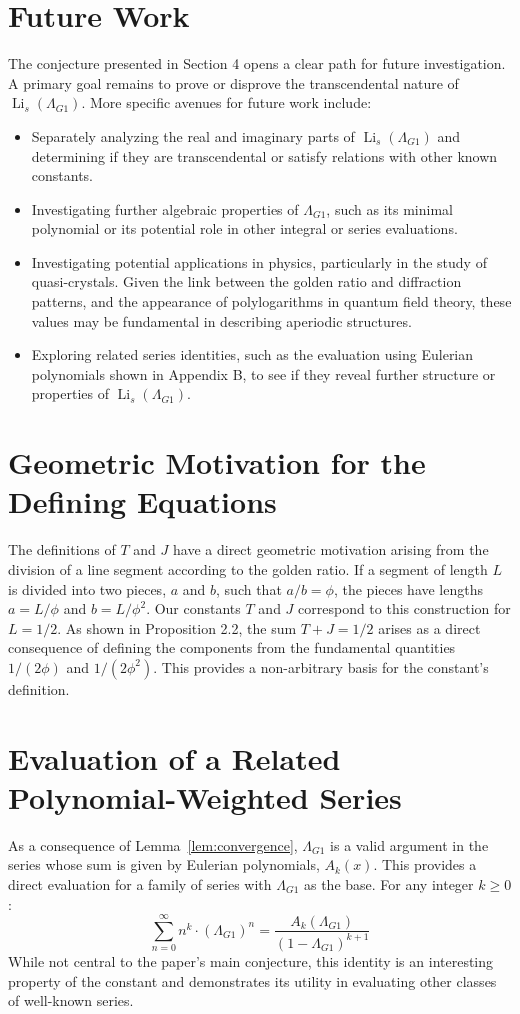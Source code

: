 \documentclass{amsart}
\theoremstyle{plain}
\theoremstyle{definition}
\theoremstyle{remark}
\DeclareMathOperator{\Li}{Li} %
\newcommand{\LambdaG}{\Lambda_{G1}}
\newcommand{\phiG}{\phi}
\begin{document}
\section{Future Work}
The conjecture presented in Section 4 opens a clear path for future investigation. A primary goal remains to prove or disprove the transcendental nature of $\Li_s(\LambdaG)$. More specific avenues for future work include:
\begin{itemize}
    \item Separately analyzing the real and imaginary parts of $\Li_s(\LambdaG)$ and determining if they are transcendental or satisfy relations with other known constants.
    \item Investigating further algebraic properties of $\LambdaG$, such as its minimal polynomial or its potential role in other integral or series evaluations.
    \item Investigating potential applications in physics, particularly in the study of quasi-crystals. Given the link between the golden ratio and diffraction patterns, and the appearance of polylogarithms in quantum field theory, these values may be fundamental in describing aperiodic structures.
    \item Exploring related series identities, such as the evaluation using Eulerian polynomials shown in Appendix B, to see if they reveal further structure or properties of $\Li_s(\LambdaG)$.
\end{itemize}

\appendix
\section{Geometric Motivation for the Defining Equations}
The definitions of $T$ and $J$ have a direct geometric motivation arising from the division of a line segment according to the golden ratio. If a segment of length $L$ is divided into two pieces, $a$ and $b$, such that $a/b = \phiG$, the pieces have lengths $a=L/\phiG$ and $b=L/\phiG^2$. Our constants $T$ and $J$ correspond to this construction for $L=1/2$. As shown in Proposition 2.2, the sum $T+J=1/2$ arises as a direct consequence of defining the components from the fundamental quantities $1/(2\phiG)$ and $1/(2\phiG^2)$. This provides a non-arbitrary basis for the constant's definition.

\section{Evaluation of a Related Polynomial-Weighted Series}
As a consequence of Lemma~\ref{lem:convergence}, $\LambdaG$ is a valid argument in the series whose sum is given by Eulerian polynomials, $A_k(x)$. This provides a direct evaluation for a family of series with $\LambdaG$ as the base. For any integer $k \ge 0$:
\[ \sum_{n=0}^{\infty} n^k \cdot (\LambdaG)^n = \frac{A_k(\LambdaG)}{(1-\LambdaG)^{k+1}} \]
While not central to the paper's main conjecture, this identity is an interesting property of the constant and demonstrates its utility in evaluating other classes of well-known series.
\end{document}
